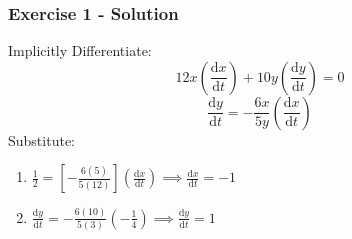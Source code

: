 \documentclass[12pt]{beamer}
\begin{document}
\begin{frame}
	\frametitle{Exercise 1 - Solution}

	Implicitly Differentiate:
	\[12x\left(\frac{\mathrm{d}x}{\mathrm{d}t}\right)+10y\left(\frac{\mathrm{d}y}{\mathrm{d}t}\right)=0\]
	\[\frac{\mathrm{d}y}{\mathrm{d}t}=-\frac{6x}{5y}\left(\frac{\mathrm{d}x}{\mathrm{d}t}\right)\]
	Substitute:
	\large
	\begin{enumerate}\itemsep1ex
		\item $\frac{1}{2}=\left[-\frac{6(5)}{5(12)}\right]\left(\frac{\mathrm{d}x}{\mathrm{d}t}\right)\implies \boxed{\frac{\mathrm{d}x}{\mathrm{d}t}=-1}$
		\item $\frac{\mathrm{d}y}{\mathrm{d}t}=-\frac{6(10)}{5(3)}\left(-\frac{1}{4}\right)\implies \boxed{\frac{\mathrm{d}y}{\mathrm{d}t}=1}$
	\end{enumerate}
\end{frame}
\end{document}
